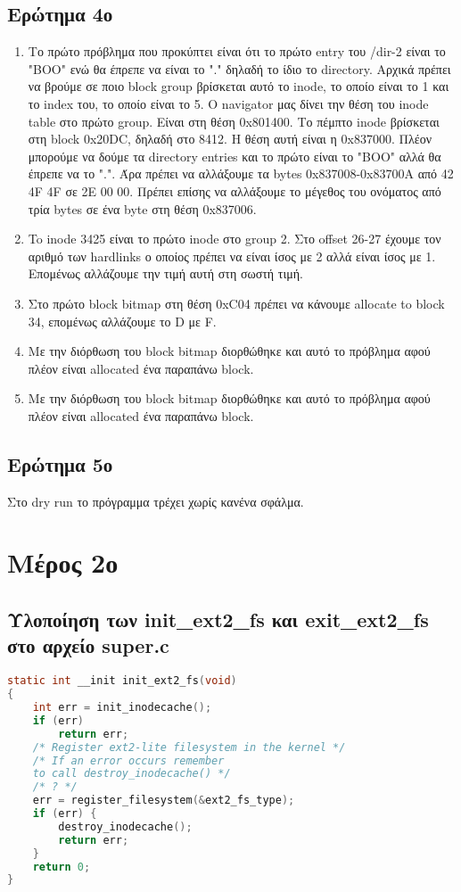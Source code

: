 \documentclass{article}
\begin{document}
\begin{enumerate}
\subsection{Ερώτημα 4ο}
\begin{enumerate}
    \item{Το πρώτο πρόβλημα που προκύπτει είναι ότι το πρώτο entry του /dir-2 είναι το "ΒΟΟ" ενώ θα έπρεπε να είναι το "." δηλαδή το ίδιο το directory.
          Αρχικά πρέπει να βρούμε σε ποιο block group βρίσκεται αυτό το inode, το οποίο είναι το 1 και το index του, το οποίο είναι
          το 5. Ο navigator μας δίνει την θέση του inode table στο πρώτο group. Είναι στη θέση 0x801400. Το πέμπτο inode βρίσκεται 
          στη block 0x20DC, δηλαδή στο 8412. Η θέση αυτή είναι η 0x837000. Πλέον μπορούμε να δούμε τα directory entries και το πρώτο 
          είναι το "BOO" αλλά θα έπρεπε να το ".". Άρα πρέπει να αλλάξουμε τα bytes 0x837008-0x83700A από 42 4F 4F σε 2Ε 00 00. Πρέπει επίσης 
            να αλλάξουμε το μέγεθος του ονόματος από τρία bytes σε ένα byte στη θέση 0x837006.}
    \item{To inode 3425 είναι το πρώτο inode στο group 2. Στο offset 26-27 έχουμε τον αριθμό των hardlinks ο οποίος πρέπει να είναι 
        ίσος με 2 αλλά είναι ίσος με 1. Επομένως αλλάζουμε την τιμή αυτή στη σωστή τιμή.}
    \item{Στο πρώτο block bitmap στη θέση 0xC04 πρέπει να κάνουμε allocate to block 34, επομένως αλλάζουμε το D με F.}
    \item{Με την διόρθωση του block bitmap διορθώθηκε και αυτό το πρόβλημα αφού πλέον είναι allocated ένα παραπάνω block.}
    \item{Με την διόρθωση του block bitmap διορθώθηκε και αυτό το πρόβλημα αφού πλέον είναι allocated ένα παραπάνω block.}
\end{enumerate}

\subsection{Ερώτημα 5ο}
Στο dry run το πρόγραμμα τρέχει χωρίς κανένα σφάλμα.\\
\pagebreak

\section{Μέρος 2ο}
\subsection{Υλοποίηση των init\_ext2\_fs και exit\_ext2\_fs στο αρχείο super.c}
\begin{lstlisting}[language=C]
static int __init init_ext2_fs(void)
{
	int err = init_inodecache();
	if (err)
		return err;
	/* Register ext2-lite filesystem in the kernel */
	/* If an error occurs remember
    to call destroy_inodecache() */
	/* ? */
    err = register_filesystem(&ext2_fs_type);
    if (err) { 
        destroy_inodecache();
        return err;
    }
    return 0;
}


\end{lstlisting}
\end{enumerate}
\end{document}
